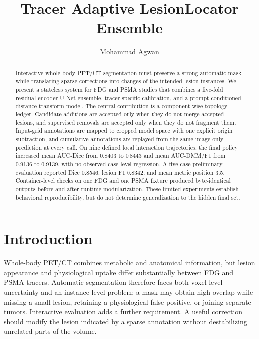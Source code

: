 \documentclass[runningheads]{llncs}
\begin{document}
\title{Tracer Adaptive LesionLocator Ensemble}
\author{Mohammad Agwan}
\maketitle

\begin{abstract}
Interactive whole-body PET/CT segmentation must preserve a strong automatic
mask while translating sparse corrections into changes of the intended lesion
instances. We present a stateless system for FDG and PSMA studies that combines
a five-fold residual-encoder U-Net ensemble, tracer-specific calibration, and
a prompt-conditioned distance-transform model. The central contribution is a
component-wise topology ledger. Candidate additions are accepted only when
they do not merge accepted lesions, and supervised removals are accepted only
when they do not fragment them. Input-grid annotations are mapped to cropped
model space with one explicit origin subtraction, and cumulative annotations
are replayed from the same image-only prediction at every call. On nine defined
local interaction trajectories, the final policy increased mean AUC-Dice from
0.8403 to 0.8443 and mean AUC-DMM/F1 from 0.9136 to 0.9139, with no observed
case-level regression. A five-case preliminary evaluation reported Dice
0.8546, lesion F1 0.8342, and mean metric position 3.5. Container-level checks
on one FDG and one PSMA fixture produced byte-identical outputs before and
after runtime modularization. These limited experiments establish behavioral
reproducibility, but do not determine generalization to the hidden final set.
\end{abstract}

\section{Introduction}

Whole-body PET/CT combines metabolic and anatomical information, but lesion
appearance and physiological uptake differ substantially between FDG and PSMA
tracers. Automatic segmentation therefore faces both voxel-level uncertainty
and an instance-level problem: a mask may obtain high overlap while missing a
small lesion, retaining a physiological false positive, or joining separate
tumors. Interactive evaluation adds a further requirement. A useful correction
should modify the lesion indicated by a sparse annotation without destabilizing
unrelated parts of the volume.
\end{document}
